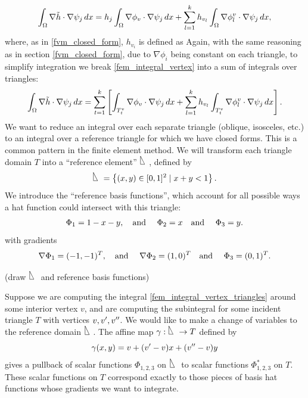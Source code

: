 \begin{equation}\label{fem_integral_vertex}
    \int_{{\Omega}} \nabla \tilde{h}\cdot \nabla \psi_j\,dx
     = h_j\int_{{\Omega}}\nabla\phi_v\cdot\nabla\psi_j\,dx + \sum_{l=1}^{k}h_{v_l}\int_{{\Omega}}\nabla\phi^v_l\cdot\nabla\psi_j\,dx,
\end{equation}
where, as in \ref{fvm_closed_form}, $h_{v_i}$ is defined as
\hvidefinition
Again, with the same reasoning as in section \ref{fvm_closed_form}, due to $\nabla\phi_i$ being constant on each triangle, to simplify integration
we break \eqref{fem_integral_vertex} into a sum of integrals over triangles:
\begin{equation}\label{fem_integral_vertex_triangles}
    \int_{{\Omega}} \nabla \tilde{h}\cdot \nabla \psi_j\,dx
    = \sum_{t=1}^k\left[\int_{T^v_t}\nabla\phi_v\cdot\nabla\psi_j\,dx + \sum_{l=1}^{k}h_{v_l}\int_{T^v_t}\nabla\phi^v_l\cdot\nabla\psi_j\,dx\right].
\end{equation}
We want to reduce an integral over each separate triangle (oblique, isosceles, etc.) to an integral over a reference triangle
for which we have closed forms.
This is a common pattern in the finite element method.
We will transform each triangle domain $T$ into a ``reference element''
\def\ll{{\mbox{\begin{picture}(7,10)
\put(1,0){\line(1,0){5}}
\put(6,0){\line(-1,2){5}}
\put(1,0){\line(0,1){10}}
\end{picture}
}}}
$\ll$, defined by
    $$\ll = \left\{(x,y) \in [0,1]^2 \mid x + y < 1\right\}.$$
We introduce the ``reference basis functions'', which account for all possible ways a hat function could intersect with this triangle:
\begin{equation}\label{fem_reference_basis_functions}
    \Phi_1 = 1-x-y, \text{\quad and \quad} \Phi_2 = x \text{\quad and \quad} \Phi_3 = y.
\end{equation}
with gradients
\begin{equation}\label{fem_reference_basis_function_gradients}
    \nabla\Phi_1 = (-1, -1)^T, \text{\quad and \quad} \nabla\Phi_2 = (1,0)^T \text{\quad and \quad} \Phi_3 = (0,1)^T.
\end{equation}

\vskip 0.2in
(draw $\ll$ and reference basis functions)
\vskip 0.2in

Suppose we are computing the integral \eqref{fem_integral_vertex_triangles} around some interior vertex $v$,
and are computing the subintegral for some incident triangle $T$ with vertices $v,v^{\prime},v^{\prime\prime}$.
We would like to make a change of variables to the reference domain $\ll$.
The affine map
\newcommand{\affmap}{\gamma}
$\affmap : \ll \rightarrow T$ defined by
\begin{equation}\label{fem_affine_map}
    \affmap(x,y) = v + (v^\pr - v)x + (v^\ppr - v)y
\end{equation}
gives a pullback of scalar functions $\Phi_{1,2,3}$ on $\ll$
to scalar functions $\Phi_{1,2,3}^*$ on $T$. These scalar functions on $T$ correspond
exactly to those pieces of basis hat functions whose gradients we want to integrate.

